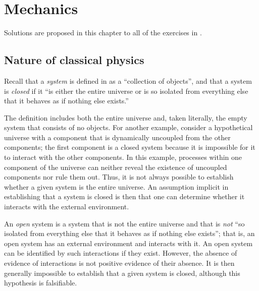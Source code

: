 

\chapter{Mechanics}\label{chap:mechanics}

Solutions are proposed in this chapter to all of the exercises in \cite{TM}.

\localtableofcontents

\section{Nature of classical physics}

\begin{answer}
	Recall that a \emph{system} is defined in \cite[Lecture 1]{TM} as a ``collection of objects'', and that a system is \emph{closed} if it ``is either the entire universe or is so isolated from everything else that it behaves as if nothing else exists.''

	The definition includes both the entire universe and, taken literally, the empty system that consists of no objects.
	For another example, consider a hypothetical universe with a component that is dynamically uncoupled from the other components; the first component is a closed system because it is impossible for it to interact with the other components.
	In this example, processes within one component of the universe can neither reveal the existence of uncoupled components nor rule them out.
	Thus, it is not always possible to establish whether a given system is the entire universe.
	An assumption implicit in establishing that a system is closed is then that one can determine whether it interacts with the external environment.

	An \emph{open} system is a system that is not the entire universe and that is \emph{not} ``so isolated from everything else that it behaves as if nothing else exists''; that is, an open system has an external environment and interacts with it.
	An open system can be identified by such interactions if they exist.
	However, the absence of evidence of interactions is not positive evidence of their absence.
	It is then generally impossible to establish that a given system is closed, although this hypothesis is falsifiable.
\end{answer}

